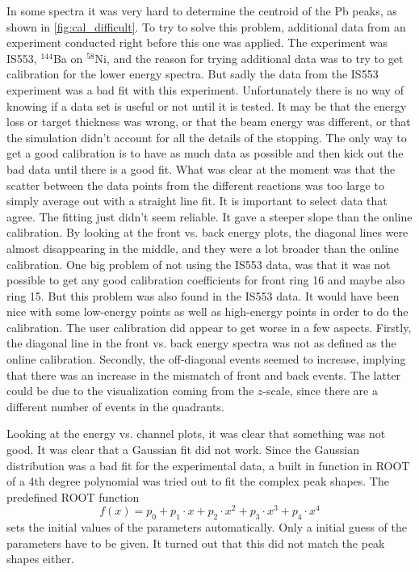\documentclass[twoside,english]{uiofysmaster/uiofysmaster}
\let\orgautoref\autoref
\renewcommand{\autoref}
        {%
		 \def\subsectionautorefname{Section}%
		 \def\subsubsectionautorefname{Section}%
          \orgautoref}
\begin{document}
In some spectra it was very hard to determine the centroid of the Pb peaks, as shown in \autoref{fig:cal_difficult}. 
To try to solve this problem, additional data from an experiment conducted right before this one was applied. 
The experiment was IS553, $^{144}$Ba on $^{58}$Ni, and the reason for trying additional data was to try to get calibration for the lower energy spectra. 
But sadly the data from the IS553 experiment was a bad fit with this experiment. 
Unfortunately there is no way of knowing if a data set is useful or not until it is tested. 
It may be that the energy loss or target thickness was wrong, or that the beam energy was different, or that the simulation didn't account for all the details of the stopping. 
The only way to get a good calibration is to have as much data as possible and then kick out the bad data until there is a good fit. 
What was clear at the moment was that the scatter between the data points from the different reactions was too large to simply average out with a straight line fit. 
It is important to select data that agree.
The fitting just didn't seem reliable.
It gave a steeper slope than the online calibration.
By looking at the front vs. back energy plots, the diagonal lines were almost disappearing in the middle, and they were a lot broader than the online calibration. 
One big problem of not using the IS553 data, was that it was not possible to get any good calibration coefficients for front ring 16 and maybe also ring 15.
But this problem was also found in the IS553 data.
It would have been nice with some low-energy points as well as high-energy points in order to do the calibration. 
The user calibration did appear to get worse in a few aspects. 
Firstly, the diagonal line in the front vs. back energy spectra was not as defined as the online calibration.
Secondly, the off-diagonal events seemed to increase, implying that there was an increase in the mismatch of front and back events. 
The latter could be due to the visualization coming from the $z$-scale, since there are a different number of events in the quadrants. 

Looking at the energy vs. channel plots, it was clear that something was not good.
It was clear that a Gaussian fit did not work. 
Since the Gaussian distribution was a bad fit for the experimental data, a built in function in ROOT of a 4th degree polynomial was tried out to fit the complex peak shapes. 
The predefined ROOT function 
\begin{equation}
	f(x) = p_0 + p_1 \cdot x + p_2 \cdot x^2 + p_3 \cdot x^3 + p_4 \cdot x^4
\end{equation}
sets the initial values of the parameters automatically. 
Only a initial guess of the parameters have to be given.
It turned out that this did not match the peak shapes either. 
\end{document}
